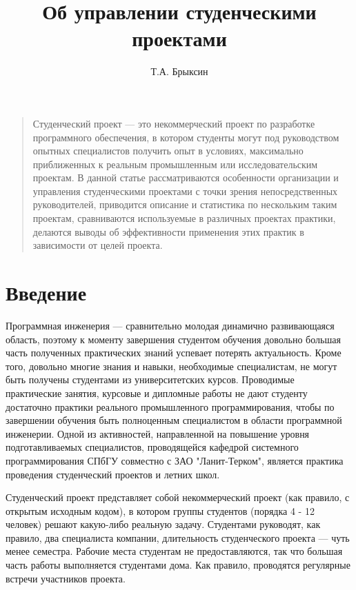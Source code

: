 \documentclass[a5paper]{article}
\title{Об управлении студенческими проектами}
\author{Т.А. Брыксин}
\date{}
\begin{document}
\maketitle
\thispagestyle{empty}


\begin{quote}
\small\noindent
Студенческий проект --- это некоммерческий проект по разработке программного обеспечения, в котором студенты могут под руководством опытных специалистов получить опыт в условиях, максимально приближенных к реальным промышленным или исследовательским проектам. В данной статье рассматриваются особенности организации и управления студенческими проектами с точки зрения непосредственных руководителей, приводится описание и статистика по нескольким таким проектам, сравниваются  используемые в различных проектах практики, делаются выводы об эффективности применения этих практик в зависимости от целей проекта.
\end{quote}

\section*{Введение}
Программная инженерия --- сравнительно молодая динамично развивающаяся область, поэтому к моменту завершения студентом обучения довольно большая часть полученных практических знаний успевает потерять актуальность. Кроме того, довольно многие знания и навыки, необходимые специалистам, не могут быть получены студентами из университетских курсов. Проводимые практические занятия, курсовые и дипломные работы не дают студенту достаточно практики реального  промышленного программирования, чтобы по завершении обучения быть полноценным специалистом в области программной инженерии. Одной из активностей, направленной на повышение уровня подготавливаемых специалистов, проводящейся кафедрой системного программирования СПбГУ совместно с ЗАО "Ланит-Терком", является практика проведения студенческий проектов и летних школ.

Студенческий проект представляет собой некоммерческий проект (как правило, с открытым исходным кодом), в котором группы студентов (порядка 4 - 12 человек) решают какую-либо реальную задачу. Студентами руководят, как правило, два специалиста компании, длительность студенческого проекта --- чуть менее семестра. Рабочие места студентам не предоставляются, так что большая часть работы выполняется студентами дома. Как правило, проводятся регулярные встречи участников проекта.
\end{document}

